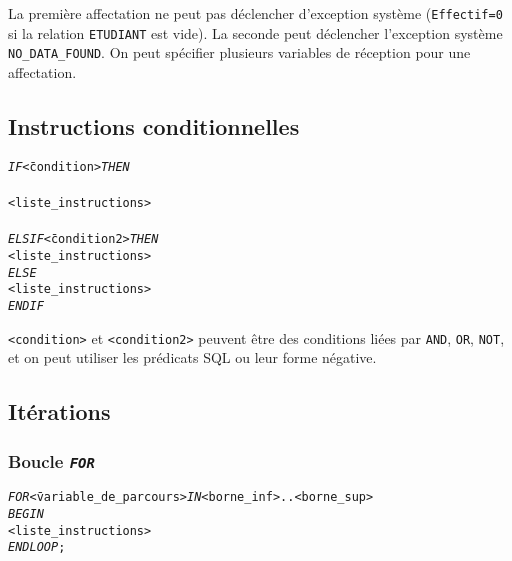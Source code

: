 \documentclass[10pt]{article}
\begin{document}
				La première affectation ne peut pas déclencher d'exception système (\texttt{Effectif=0} si la relation \texttt{ETUDIANT} est vide).
				La seconde peut déclencher l'exception système \texttt{NO\_DATA\_FOUND}.
				On peut spécifier plusieurs variables de réception pour une affectation.
				
		\subsection{Instructions conditionnelles}
			\begin{alltt}
				\begin{tabbing}
					\emph{IF}\= <condition> \emph{THEN}\\
						\\
						\><liste_instructions>\\
						\>[\emph{END}]\\
					\emph{ELSIF}\= <condition2> \emph{THEN}\\
						\><liste_instructions>\\
					\emph{ELSE}\=\\
						\><liste_instructions>\\
					\emph{END IF}
				\end{tabbing}
			\end{alltt}
			
			\texttt{<condition>} et \texttt{<condition2>} peuvent être des conditions liées par \texttt{AND}, \texttt{OR}, \texttt{NOT}, et on peut utiliser les prédicats SQL ou leur forme négative.
			
		\subsection{Itérations}
			\subsubsection{Boucle \emph{\texttt{FOR}}}\index{FOR}
				\begin{alltt}
					\begin{tabbing}
						\emph{FOR}\= <variable_de_parcours> \emph{IN} <borne_inf>..<borne_sup>\\
						\emph{BEGIN}\\
							\><liste_instructions>\\
						\emph{END LOOP};
					\end{tabbing}
				\end{alltt}
		
\end{document}
